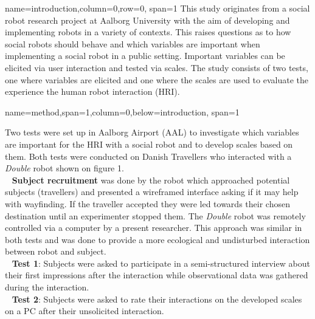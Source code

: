 \documentclass[paperwidth=160cm,paperheight=100cm,landscape,fontscale=0.2941]{baposter}
\begin{document}
\begin{poster}
{name=introduction,column=0,row=0, span=1}
{\parskip 5pt   
This study originates from a social robot research project at Aalborg University with the aim of developing and implementing robots in a variety of contexts. This raises questions as to how social robots should behave and which variables are important when implementing a social robot in a public setting. Important variables can be elicited via user interaction and tested via scales. The study consists of two tests, one where variables are elicited and one where the scales are used to evaluate the experience the human robot interaction (HRI). %
}

{name=method,span=1,column=0,below=introduction, span=1}
{\parskip 5pt 
Two tests were set up in Aalborg Airport (AAL) to investigate which variables are important for the HRI with a social robot and to develop scales based on them. Both tests were conducted on Danish Travellers who interacted with a \textit{Double} robot shown on figure 1.\\
\textbullet~ \textbf{Subject recruitment} was done by the robot which approached potential subjects (travellers) and presented a wireframed interface asking if it may help with wayfinding. If the traveller accepted  they were led towards their chosen destination until an experimenter stopped them. The \textit{Double} robot was remotely controlled via a computer by a present researcher. This approach was similar in both tests and was done to provide a more ecological and undisturbed interaction between robot and subject.\\
\textbullet~ \textbf{Test 1}: Subjects were asked to participate in a semi-structured interview about their first impressions after the interaction while observational data was gathered during the interaction. \\
\textbullet~ \textbf{Test 2}: Subjects were asked to rate their interactions on the developed scales on a PC after their unsolicited interaction.
\vspace{-10pt}  

}
\end{poster}
\end{document}
